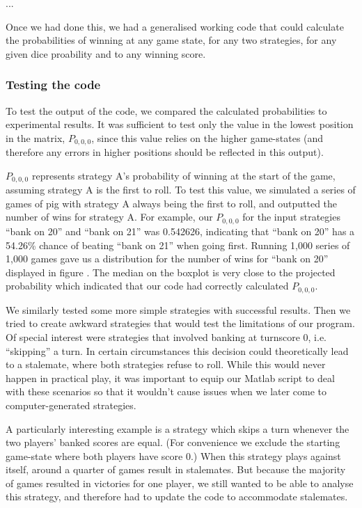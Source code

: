 \documentclass[a4paper,titlepage]{article}
\begin{document}


...

Once we had done this, we had a generalised working code that could calculate the
probabilities of winning at any game state, for any two strategies, for any given
dice proability and to any winning score.

\subsubsection{Testing the code}


To test the output of the code, we compared the calculated probabilities to experimental results. It was sufficient to test only the value in the lowest position in the matrix, $P_{0,0,0}$, since this value relies on the higher game-states (and therefore any errors in higher positions should be reflected in this output).

$P_{0,0,0}$ represents strategy A's probability of winning at the start of the game, assuming strategy A is the first to roll. To test this value, we simulated a series of games of pig with strategy A always being the first to roll, and outputted the number of wins for strategy A. For example, our $P_{0,0,0}$ for the input strategies ``bank on 20'' and ``bank on 21'' was 0.542626, indicating that ``bank on 20'' has a 54.26\% chance of beating ``bank on 21'' when going first. Running 1,000 series of 1,000 games gave us a distribution for the number of wins for ``bank on 20'' displayed in figure %
. The median on the boxplot is very close to the projected probability which indicated that our code had correctly calculated $P_{0,0,0}$.


We similarly tested some more simple strategies with successful results. Then we tried to create awkward strategies that would test the limitations of our program. Of special interest were strategies that involved banking at turnscore 0, i.e. ``skipping'' a turn. In certain circumstances this decision could theoretically lead to a stalemate, where both strategies refuse to roll. While this would never happen in practical play, it was important to equip our Matlab script to deal with these scenarios so that it wouldn't cause issues when we later come to computer-generated strategies.

A particularly interesting example is a strategy which skips a turn whenever the two players' banked scores are equal. (For convenience we exclude the starting game-state where both players have score 0.) When this strategy plays against itself, around a quarter of games result in stalemates. But because the majority of games resulted in victories for one player, we still wanted to be able to analyse this strategy, and therefore had to update the code to accommodate stalemates.
\end{document}
